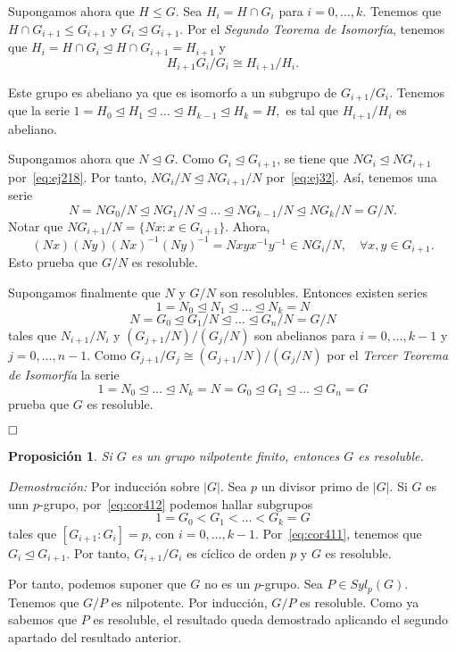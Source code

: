 \documentclass[12pt]{article}
\newtheorem{proposition}[theorem]{Proposición}
\begin{document}
Supongamos ahora que $H \leq G$. Sea $H_i = H \cap G_i$ para $i = 0, \ldots, k$. Tenemos que $H \cap G_{i+1} \leq G_{i+1}$ y $G_i \unlhd G_{i+1}$. Por el \textit{Segundo Teorema de Isomorfía}, tenemos que $H_i = H \cap G_i \unlhd H \cap G_{i+1} = H_{i+1}$ y $$H_{i+1}G_i/G_i \cong H_{i+1}/H_{i}.$$

Este grupo es abeliano ya que es isomorfo a un subgrupo de $G_{i+1}/G_i$. Tenemos que la serie $1 = H_0 \unlhd H_1 \unlhd \ldots \unlhd H_{k-1} \unlhd H_k = H,$ es tal que $H_{i+1}/H_{i}$ es abeliano. 

Supongamos ahora que $N \unlhd G$. Como $G_i \unlhd G_{i+1}$, se tiene que $NG_i \unlhd NG_{i+1}$ por~\ref{eq:ej218}. Por tanto, $NG_i/N \unlhd NG_{i+1}/N$ por~\ref{eq:ej32}. Así, tenemos una serie $$N = NG_0/N \unlhd NG_1/N \unlhd \ldots \unlhd NG_{k-1}/N \unlhd NG_k/N = G/N.$$ Notar que $NG_{i+1}/N = \lbrace Nx : x \in G_{i+1} \rbrace$. Ahora, $$(Nx)(Ny)(Nx)^{-1}(Ny)^{-1} = Nxyx^{-1}y^{-1} \in NG_i/N, \quad \forall x,y \in G_{i+1}.$$ Esto prueba que $G/N$ es resoluble. 

Supongamos finalmente que $N$ y $G/N$ son resolubles. Entonces existen series $$1 = N_0 \unlhd N_1 \unlhd \ldots \unlhd N_k = N$$ $$N = G_0 \unlhd G_1/N \unlhd \ldots \unlhd G_n/N = G/N$$ tales que $N_{i+1}/N_i$ y $(G_{j+1}/N)/(G_j/N)$ son abelianos para $i = 0, \ldots, k-1$ y $j = 0, \ldots, n-1$. Como $G_{j+1}/G_j \cong (G_{j+1}/N)/(G_j/N)$ por el \textit{Tercer Teorema de Isomorfía} la serie $$1 = N_0 \unlhd \ldots \unlhd N_k = N = G_0 \unlhd G_1 \unlhd \ldots \unlhd G_n = G$$ prueba que $G$ es resoluble.

$\hfill \square$

\begin{proposition}Si $G$ es un grupo nilpotente finito, entonces $G$ es resoluble.
\end{proposition}
\emph{Demostración: }Por inducción sobre $|G|$. Sea $p$ un divisor primo de $|G|$. Si $G$ es unn $p$-grupo, por~\ref{eq:cor412} podemos hallar subgrupos $$1 = G_0 < G_1 <\ldots < G_k = G$$ tales que $[G_{i+1}:G_i] = p$, con $i=0, \ldots, k-1$. Por~\ref{eq:cor411}, tenemos que $G_i \unlhd G_{i+1}$. Por tanto, $G_{i+1}/G_i$ es cíclico de orden $p$ y $G$ es resoluble. 

Por tanto, podemos suponer que $G$ no es un $p$-grupo. Sea $P \in Syl_p(G)$. Tenemos que $G/P$ es nilpotente. Por inducción, $G/P$ es resoluble. Como ya sabemos que $P$ es resoluble, el resultado queda demostrado aplicando el segundo apartado del resultado anterior. 
\end{document}
